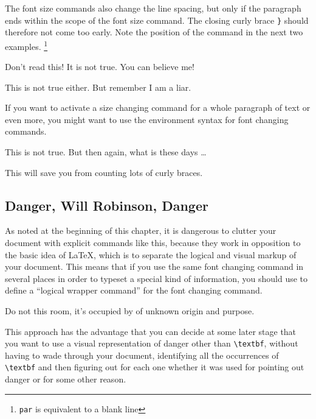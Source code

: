 The font size commands also change the line spacing, but only if the
paragraph ends within the scope of the font size command. The closing curly
brace \verb|}| should therefore not come too early.  Note the position of
the  command in the next two examples. \footnote{\texttt{\bs{}par}
is equivalent to a blank line}


\begin{example}
{\Large Don't read this!
 It is not true.
 You can believe me!\par}
\end{example}

\begin{example}
{\Large This is not true either.
But remember I am a liar.}\par
\end{example}

If you want to activate a size changing command for a whole paragraph
of text or even more, you might want to use the environment syntax for
font changing commands.

\begin{example}
\begin{Large}
This is not true.
But then again, what is these
days \ldots
\end{Large}
\end{example}

\noindent This will save you from counting lots of curly braces.

\subsection{Danger, Will Robinson, Danger}

As noted at the beginning of this chapter, it is dangerous to clutter
your document with explicit commands like this, because they work in
opposition to the basic idea of \LaTeX{}, which is to separate the
logical and visual markup of your document.  This means that if you
use the same font changing command in several places in order to
typeset a special kind of information, you should use
 to define a ``logical wrapper command'' for the font
changing command.

\begin{example}
Do not  this room,
it's occupied by 
of unknown origin and purpose.
\end{example}

This approach has the advantage that you can decide at some later
stage that you want to use a visual representation of danger other
than \verb|\textbf|, without having to wade through your document,
identifying all the occurrences of \verb|\textbf| and then figuring out
for each one whether it was used for pointing out danger or for some other
reason.

